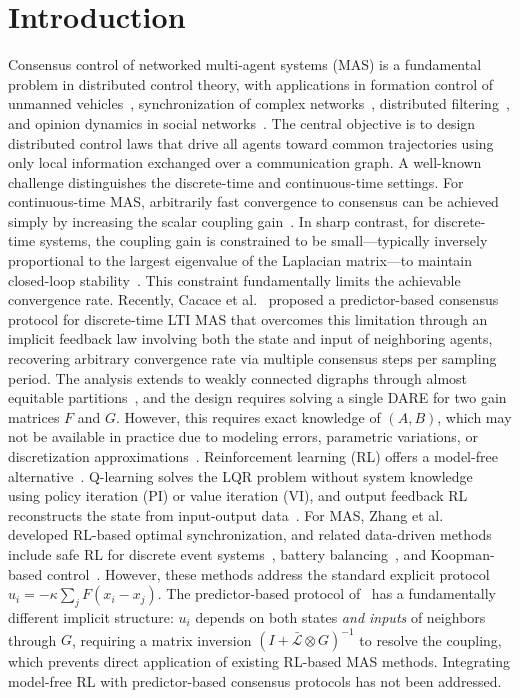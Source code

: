 \documentclass[12pt]{elsarticle}
\theoremstyle{remark}
\begin{document}
\section{Introduction}
\label{sec:intro}
Consensus control of networked multi-agent systems (MAS) is a fundamental problem in distributed control theory, with applications in formation control of unmanned vehicles~\cite{francis2016,dony2021distributed,dong2020tracking}, synchronization of complex networks~\cite{dorfler2014,li2010}, distributed filtering~\cite{battistelli2014}, and opinion dynamics in social networks~\cite{proskurnikov2017}. The central objective is to design distributed control laws that drive all agents toward common trajectories using only local information exchanged over a communication graph.
A well-known challenge distinguishes the discrete-time and continuous-time settings. For continuous-time MAS, arbitrarily fast convergence to consensus can be achieved simply by increasing the scalar coupling gain~\cite{li2014,liu2021}. In sharp contrast, for discrete-time systems, the coupling gain is constrained to be small---typically inversely proportional to the largest eigenvalue of the Laplacian matrix---to maintain closed-loop stability~\cite{ma2015,ren2010,xiao2004}. This constraint fundamentally limits the achievable convergence rate.
Recently, Cacace et al.~\cite{cacace2024} proposed a predictor-based consensus protocol for discrete-time LTI MAS that overcomes this limitation through an implicit feedback law involving both the state and input of neighboring agents, recovering arbitrary convergence rate via multiple consensus steps per sampling period. The analysis extends to weakly connected digraphs through almost equitable partitions~\cite{monaco2019}, and the design requires solving a single DARE for two gain matrices $F$ and $G$. However, this requires exact knowledge of $(A,B)$, which may not be available in practice due to modeling errors, parametric variations, or discretization approximations~\cite{dony2020tracking,dong2020tracking,dony2021robust}.
Reinforcement learning (RL) offers a model-free alternative~\cite{lewis2009}. Q-learning solves the LQR problem without system knowledge~\cite{bradtke1994} using policy iteration (PI) or value iteration (VI), and output feedback RL reconstructs the state from input-output data~\cite{lewis2009,rizvi2022}. For MAS, Zhang et al.~\cite{zhang2011} developed RL-based optimal synchronization, and related data-driven methods include safe RL for discrete event systems~\cite{dony2025debf}, battery balancing~\cite{dony2026battery}, and Koopman-based control~\cite{dony2024koopman}. However, these methods address the standard explicit protocol $u_i = -\kappa \sum_j F(x_i - x_j)$. The predictor-based protocol of~\cite{cacace2024} has a fundamentally different implicit structure: $u_i$ depends on both states \emph{and inputs} of neighbors through $G$, requiring a matrix inversion $(I + \bar{\mathcal{L}} \otimes G)^{-1}$ to resolve the coupling, which prevents direct application of existing RL-based MAS methods. Integrating model-free RL with predictor-based consensus protocols has not been addressed.
\end{document}
